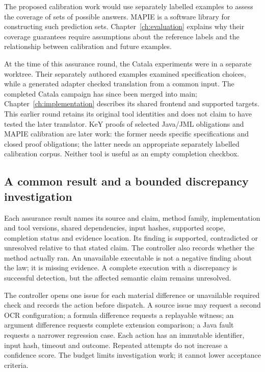 \documentclass[12pt,a4paper,oneside,openany]{book}
\begin{document}
The proposed calibration work would use separately labelled examples to assess
the coverage of sets of possible answers. MAPIE is a software library for
constructing such prediction sets. Chapter~\ref{ch:evaluation} explains why
their coverage guarantees require assumptions about the reference labels and
the relationship between calibration and future examples.

At the time of this assurance round, the Catala experiments were in a separate
worktree. Their separately authored examples examined specification choices,
while a generated adapter checked translation from a common input. The completed
Catala campaign has since been merged into main; Chapter~\ref{ch:implementation}
describes its shared frontend and supported targets. This earlier round retains
its original tool identities and does not claim to have tested the later
translator. KeY proofs of selected Java/JML obligations and MAPIE calibration
are later work: the former needs specific specifications and closed proof
obligations; the latter needs an appropriate separately labelled calibration
corpus. Neither tool is useful as an empty completion checkbox.

\subsection{A common result and a bounded discrepancy investigation}

Each assurance result names its source and claim, method family, implementation
and tool versions, shared dependencies, input hashes, supported scope, completion
status and evidence location. Its finding is supported, contradicted or
unresolved relative to that stated claim. The controller also records whether
the method actually ran. An unavailable executable is not a negative finding
about the law; it is missing evidence. A complete execution with a discrepancy
is successful detection, but the affected semantic claim remains unresolved.

The controller opens one issue for each material difference or unavailable
required check and records the action before dispatch. A source issue may request
a second OCR configuration; a formula difference requests a replayable witness;
an argument difference requests complete extension comparison; a Java fault
requests a narrower regression case. Each action has an immutable identifier,
input hash, timeout and outcome. Repeated attempts do not increase a confidence
score. The budget limits investigation work; it cannot lower acceptance criteria.
\end{document}
